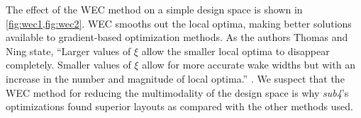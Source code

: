 	The effect of the WEC method on a simple design space is shown in \cref{fig:wec1,fig:wec2}. WEC smooths out the local optima, making better solutions available to gradient-based optimization methods. As the authors Thomas and Ning state, ``Larger values of $\xi$ allow the smaller local optima to disappear completely.
	Smaller values of $\xi$ allow for more accurate wake widths but with an increase in the number and magnitude of local optima.'' \cite{ThomasNing2018}.
	We suspect that the WEC method for reducing the multimodality of the design space is why \textit{sub4}'s optimizations found superior layouts as compared with the other methods used.


	



	


